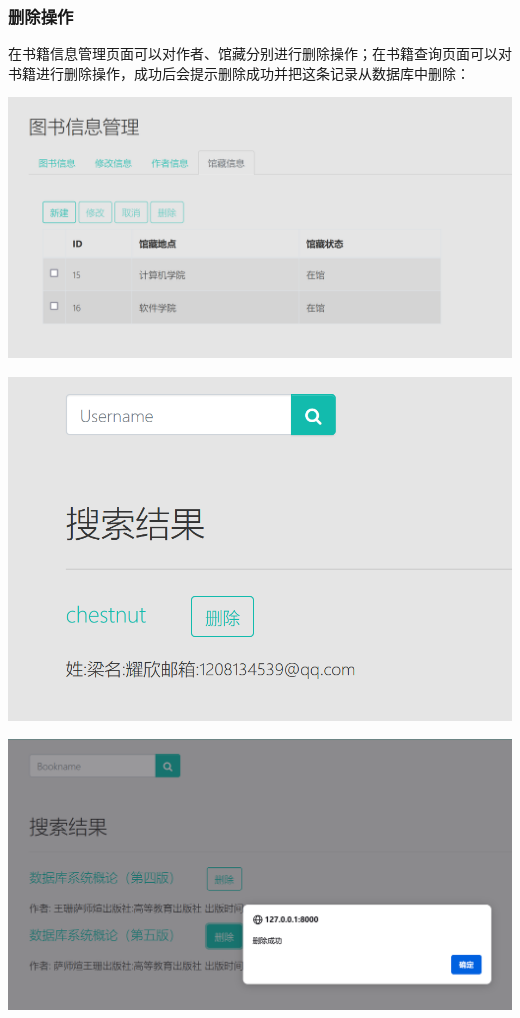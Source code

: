 \documentclass[a4paper,14pt]{article}
\begin{document}
\subsubsection{删除操作}
在书籍信息管理页面可以对作者、馆藏分别进行删除操作；在书籍查询页面可以对书籍进行删除操作，成功后会提示删除成功并把这条记录从数据库中删除：

\vspace{10pt}
\begin{center}
    \includegraphics[width=0.7\linewidth]{images/shanchu1.png}\end{center}
\vspace{5pt}


\vspace{10pt}
\begin{center}
    \includegraphics[width=0.4\linewidth]{images/shanchu2.png}\end{center}
\vspace{5pt}


\vspace{10pt}
\begin{center}
    \includegraphics[width=0.7\linewidth]{images/shanchu3.png}\end{center}
\vspace{5pt}
\end{document}
